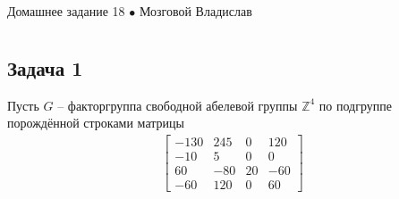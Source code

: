 \newpage
	{\large \hspace{3cm} \begin{center} Домашнее задание 18 $\bullet$ Мозговой Владислав \end{center} }
	\vspace{-1.5ex}
	\hrulefill
	
	\fontsize{12pt}{4.5mm}\selectfont
	\vspace{-3ex}
	\hrulefill
	\newline

	\section{}
		\subsection*{\textbf{Задача 1}}
		Пусть $G$ -- факторгруппа свободной абелевой группы $\mathbb{Z}^{4}$ по подгруппе порождённой строками матрицы
		\begin{gather*}
			\begin{bmatrix}
				{-130} & {245} & {0} & {120} \\
				{-10} & {5} & {0} & {0} \\
				{60} & {-80} & {20} & {-60} \\
				{-60} & {120} & {0} & {60}
			\end{bmatrix}
		\end{gather*}

